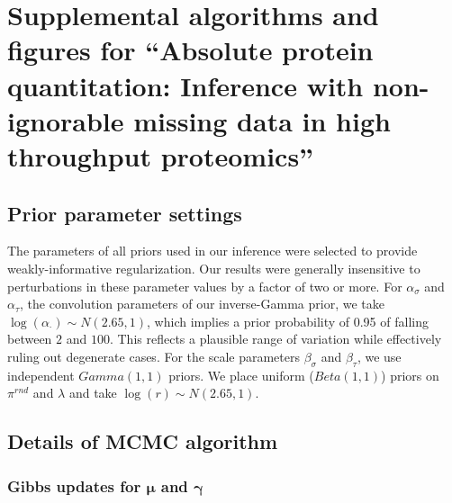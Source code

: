 


\chapter{Supplemental algorithms and figures for ``Absolute protein quantitation: Inference with non-ignorable missing data in high throughput proteomics''}
\label{ch:supp:proteomics}

\section{Prior parameter settings}

The parameters of all priors used in our inference were selected to provide weakly-informative regularization.
Our results were generally insensitive to perturbations in these parameter values by a factor of two or more.
For $\alpha_\sigma$ and $\alpha_\tau$, the convolution parameters of our inverse-Gamma prior, we take $\log(\alpha_{\cdot}) \sim N(2.65, 1)$, which implies a prior probability of 0.95 of falling between $2$ and $100$.
This reflects a plausible range of variation while effectively ruling out degenerate cases.
For the scale parameters $\beta_\sigma$ and $\beta_\tau$, we use independent $Gamma(1, 1)$ priors.
We place uniform ($Beta(1,1)$) priors on $\pi^{rnd}$ and $\lambda$ and take $\log(r) \sim N(2.65, 1)$.

\section{Details of MCMC algorithm}
\label{supp:proteomics:sec:mcmcDetails}

\subsection{Gibbs updates for $\bm \mu$ and $\bm \gamma$}
\label{supp:proteomics:sc:draw_intensity_parameters}

